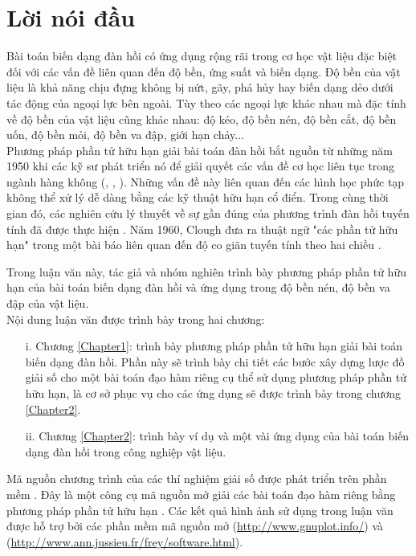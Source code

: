 \chapter*{\centering Lời nói đầu}
Bài toán biến dạng đàn hồi có ứng dụng rộng rãi trong cơ học vật liệu đặc biệt đối với các vấn đề liên quan đến độ bền, ứng suất và biến dạng. Độ bền của vật liệu là khả năng chịu đựng không bị nứt, gãy, phá hủy hay biến dạng dẻo dưới tác động của ngoại lực bên ngoài. Tùy theo các ngoại lực khác nhau mà đặc tính về độ bền của vật liệu cũng khác nhau: độ kéo, độ bền nén, độ bền cắt, độ bền uốn, độ bền mỏi, độ bền va đập, giới hạn chảy...\\
Phương pháp phần tử hữu hạn giải bài toán đàn hồi bắt nguồn từ những năm 1950 khi các kỹ sư phát triển nó để giải quyết các vấn đề cơ học liên tục trong ngành hàng không (\cite{Lev53}, \cite{ArK67}, \cite{Ode91}). Những vấn đề này liên quan đến các hình học phức tạp không thể xử lý dễ dàng bằng các kỹ thuật hữu hạn cổ điển. Trong cùng thời gian đó, các nghiên cứu lý thuyết về sự gần đúng của phương trình đàn hồi tuyến tính đã được thực hiện \cite{TuC56}. Năm 1960, Clough đưa ra thuật ngữ "các phần tử hữu hạn" trong một bài báo liên quan đến độ co giãn tuyến tính theo hai chiều \cite{Clo60}.

Trong luận văn này, tác giả và nhóm nghiên trình bày phương pháp phần tử hữu hạn của bài toán biến dạng đàn hồi và ứng dụng trong độ bền nén, độ bền va đập của vật liệu. \\[-0.5cm]

Nội dung luận văn được trình bày trong hai chương:
\begin{itemize}
\item[i.] Chương \ref{Chapter1}: trình bày phương pháp phần tử hữu hạn giải bài toán biến dạng đàn hồi. Phần này sẽ trình bày chi tiết các bước xây dựng lược đồ giải số cho một bài toán đạo hàm riêng cụ thể sử dụng phương pháp phần tử hữu hạn, là cơ sở phục vụ cho các ứng dụng sẽ được trình bày trong chương \ref{Chapter2}.
\item[ii.] Chương \ref{Chapter2}: trình bày ví dụ và một vài ứng dụng của bài toán biến dạng đàn hồi trong công nghiệp vật liệu.
\end{itemize}

Mã nguồn chương trình của các thí nghiệm giải số được phát triển trên phần mềm . Đây là một công cụ mã nguồn mở giải các bài toán đạo hàm riêng bằng phương pháp phần tử hữu hạn \cite{Hec12}. Các kết quả hình ảnh sử dụng trong luận văn được hỗ trợ bởi các phần mềm mã nguồn mở  (\url{http://www.gnuplot.info/}) và  (\url{http://www.ann.jussieu.fr/frey/software.html}).\\[-0.5cm]

